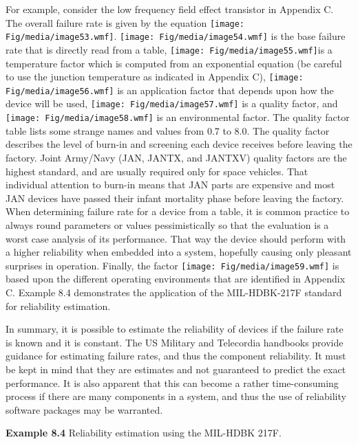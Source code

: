 For example, consider the low frequency field effect transistor in
Appendix C. The overall failure rate is given by the equation
\texttt{[image: Fig/media/image53.wmf]}.
\texttt{[image: Fig/media/image54.wmf]} is the base failure rate that is
directly read from a table, \texttt{[image: Fig/media/image55.wmf]}is a
temperature factor which is computed from an exponential equation (be
careful to use the junction temperature as indicated in Appendix C),
\texttt{[image: Fig/media/image56.wmf]} is an application factor that
depends upon how the device will be used,
\texttt{[image: Fig/media/image57.wmf]} is a quality factor, and
\texttt{[image: Fig/media/image58.wmf]} is an environmental factor. The
quality factor table lists some strange names and values from 0.7 to
8.0. The quality factor describes the level of burn-in and screening
each device receives before leaving the factory. Joint Army/Navy (JAN,
JANTX, and JANTXV) quality factors are the highest standard, and are
usually required only for space vehicles. That individual attention to
burn-in means that JAN parts are expensive and most JAN devices have
passed their infant mortality phase before leaving the factory. When
determining failure rate for a device from a table, it is common
practice to always round parameters or values pessimistically so that
the evaluation is a worst case analysis of its performance. That way the
device should perform with a higher reliability when embedded into a
system, hopefully causing only pleasant surprises in operation. Finally,
the factor \texttt{[image: Fig/media/image59.wmf]} is based upon the
different operating environments that are identified in Appendix C.
Example 8.4 demonstrates the application of the MIL-HDBK-217F standard
for reliability estimation.

In summary, it is possible to estimate the reliability of devices if the
failure rate is known and it is constant. The US Military and Telecordia
handbooks provide guidance for estimating failure rates, and thus the
component reliability. It must be kept in mind that they are estimates
and not guaranteed to predict the exact performance. It is also apparent
that this can become a rather time-consuming process if there are many
components in a system, and thus the use of reliability software
packages may be warranted.

\textbf{\hfill\break
Example 8.4} Reliability estimation using the MIL-HDBK 217F.

